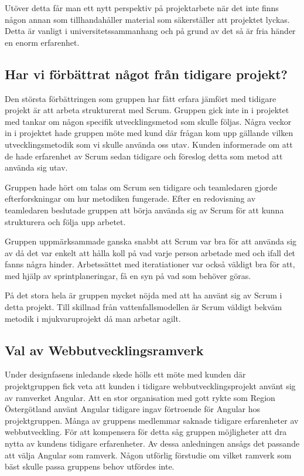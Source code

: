 Utöver detta får man ett nytt perspektiv på projektarbete när det inte finns någon annan som tillhandahåller material som säkerställer att projektet lyckas. Detta är vanligt i universitetssammanhang och på grund av det så är fria händer en enorm erfarenhet.
\subsection{Har vi förbättrat något från tidigare projekt?}

Den största förbättringen som gruppen har fått erfara jämfört med tidigare projekt är att arbeta strukturerat med Scrum. 
Gruppen gick inte in i projektet med tankar om någon specifik utvecklingsmetod som skulle följas. Några veckor in i projektet hade gruppen möte med kund där frågan kom upp gällande vilken utvecklingsmetodik som vi skulle använda oss utav. 
Kunden informerade om att de hade erfarenhet av Scrum sedan tidigare och föreslog detta som metod att använda sig utav.

Gruppen hade hört om talas om Scrum sen tidigare och teamledaren gjorde efterforskningar om hur metodiken fungerade. 
Efter en redovisning av teamledaren beslutade gruppen att börja använda sig av Scrum för att kunna strukturera och följa upp arbetet. 

Gruppen uppmärksammade ganska snabbt att Scrum var bra för att använda sig av då det var enkelt att hålla koll på vad varje person arbetade med och ifall det fanns några hinder. Arbetssättet med iteratiationer var också väldigt bra för att, med hjälp av sprintplaneringar, få en syn på vad som behöver göras. 

På det stora hela är gruppen mycket nöjda med att ha använt sig av Scrum i detta projekt. Till skillnad från vattenfallsmodellen\cite{vattenfall} är Scrum väldigt bekväm metodik i mjukvaruprojekt då man arbetar agilt.

\subsection{Val av Webbutvecklingsramverk}

Under designfasens inledande skede hölls ett möte med kunden där projektgruppen fick veta att kunden i tidigare webbutvecklingsprojekt använt sig av ramverket Angular. Att en stor organisation med gott rykte som Region Östergötland använt Angular tidigare ingav förtroende för Angular hos projektgruppen. Många av gruppens medlemmar saknade tidigare erfarenheter av webbutveckling. För att kompensera för detta såg gruppen möjligheter att dra nytta av kundens tidigare erfarenheter. Av dessa anledningen ansågs det passande att välja Angular som ramverk. Någon utförlig förstudie om vilket ramverk som bäst skulle passa gruppens behov utfördes inte.

